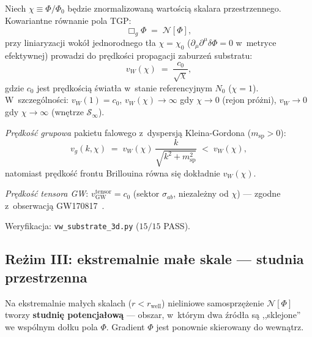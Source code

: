\begin{proposition}\label{prop:vW-substrate}
Niech $\chi \equiv \Phi/\Phi_0$ b\k{e}dzie znormalizowan\k{a} warto\'sci\k{a}
skalara przestrzennego. Kowariantne r\'ownanie pola TGP:
\begin{equation}\label{eq:field-eq-covariant}
  \Box_g\Phi \;=\; \mathcal{N}[\Phi],
\end{equation}
przy liniaryzacji wok\'o\l{} jednorodnego t\l{}a $\chi = \chi_0$
($\partial_\mu\partial^\mu\delta\Phi = 0$ w~metryce efektywnej)
prowadzi do pr\k{e}dko\'sci propagacji zaburze\'n substratu:
\begin{equation}\label{eq:vW-formula}
  v_W(\chi)
  \;=\; \frac{c_0}{\sqrt{\chi}},
\end{equation}
gdzie $c_0$ jest pr\k{e}dko\'sci\k{a} \'swiat\l{}a w~stanie referencyjnym $N_0$
($\chi=1$). W~szczeg\'olno\'sci: $v_W(1)=c_0$, $v_W(\chi)\to\infty$
gdy $\chi\to 0$ (rejon pró\.zni), $v_W\to 0$ gdy $\chi\to\infty$
(wnętrze $\mathcal{S}_\infty$).

\medskip\noindent
\emph{Pr\k{e}dko\'s\'c grupowa} pakietu falowego z~dyspersj\k{a}
Kleina-Gordona ($m_{\mathrm{sp}} > 0$):
\begin{equation}\label{eq:vg-kg}
  v_g(k,\chi)
  \;=\; v_W(\chi)\,\frac{k}{\sqrt{k^2 + m_{\mathrm{sp}}^2}}
  \;<\; v_W(\chi),
\end{equation}
natomiast pr\k{e}dko\'s\'c frontu Brillouina r\'owna si\k{e}
dok\l{}adnie $v_W(\chi)$.

\medskip\noindent
\emph{Pr\k{e}dko\'s\'c tensora GW}:
$v_{\mathrm{GW}}^{\mathrm{tensor}} = c_0$ (sektor $\sigma_{ab}$,
niezale\.zny od $\chi$) --- zgodne z~obserwacj\k{a} GW170817~\cite{GW170817,Baker2017}.

\medskip\noindent
Weryfikacja: \texttt{vw\_substrate\_3d.py} ($15/15$ PASS).
\end{proposition}

\subsection{Re\.zim III: ekstremalnie ma\l{}e skale ---
  studnia przestrzenna}\label{ssec:studnia}

\begin{proposition}\label{prop:well}
Na ekstremalnie ma\l{}ych skalach ($r < r_{\mathrm{well}}$)
nieliniowe samosprz\k{e}\.zenie $\mathcal{N}[\Phi]$ tworzy
\textbf{studni\k{e} potencja\l{}ow\k{a}} --- obszar, w~kt\'orym dwa
\'zr\'od\l{}a s\k{a} ,,sklejone'' we wsp\'olnym do\l{}ku pola $\Phi$.
Gradient $\Phi$ jest ponownie skierowany do wewn\k{a}trz.
\end{proposition}

